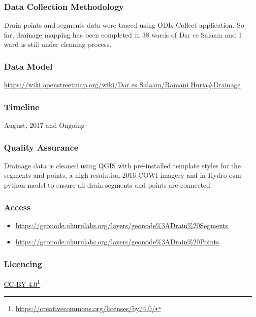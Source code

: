 \documentclass[a4paper,12pt,twoside]{article}
\begin{document}
\subsubsection{Data Collection Methodology}

Drain points and segments data were traced using ODK Collect application. So far, drainage mapping has been completed in 38 wards of Dar es Salaam and 1 ward is still under cleaning process.

\subsubsection{Data Model}
\href{https://wiki.openstreetmap.org/wiki/Dar_es_Salaam/Ramani_Huria\#Drainage}{https://wiki.openstreetmap.org/wiki/Dar es Salaam/Ramani Huria\#Drainage}

\subsubsection{Timeline}
August, 2017 and Ongoing

\subsubsection{Quality Assurance}

Drainage data is cleaned using QGIS with pre-installed template styles for the segments and points, a high resolution 2016 COWI imagery and in Hydro osm python model to ensure all drain segments and points are connected.

\subsubsection{Access}
\begin{itemize}
    \item \href{https://geonode.uhurulabs.org/layers/geonode\%3ADrain\%20Segments}{https://geonode.uhurulabs.org/layers/geonode\%3ADrain\%20Segments}
    \item \href{https://geonode.uhurulabs.org/layers/geonode\%3ADrain\%20Points}{https://geonode.uhurulabs.org/layers/geonode\%3ADrain\%20Points}
\end{itemize}

\subsubsection{Licencing}
\href{https://creativecommons.org/licenses/by/4.0/}{CC-BY 4.0}\footnote{\url{https://creativecommons.org/licenses/by/4.0/}}
\end{document}
